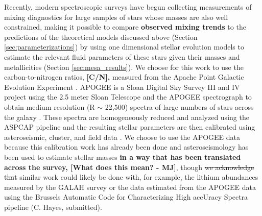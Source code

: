 

Recently, modern spectroscopic surveys have begun collecting measurements of mixing diagnostics for large samples of stars whose masses are also well constrained, making it possible to compare %
\textbf{observed mixing trends}
to the predictions of the 
theoretical models discussed above (Section \ref{sec:parameterizations}) by using one dimensional stellar evolution models to estimate the relevant fluid parameters of these stars given their masses and metallicities (Section \ref{sec:mesa_results}). 
%
We choose for this work to use the carbon-to-nitrogen ratios, \textbf{[C/N],} measured from the Apache Point Galactic Evolution Experiment \citep[APOGEE, ][]{Majewski2015,Majewski2017}. APOGEE is a Sloan Digital Sky Survey III and IV \citep{Blanton2017} project using the 2.5 meter Sloan Telescope \citep{Gunn2006} and the APOGEE spectrograph \citep{Wilson2019} to obtain medium resolution (R $\sim$ 22,500) spectra of large numbers of stars across the galaxy \citep{Zasowski2017, Beaton2021,Santana2021}. These spectra are homogeneously reduced and analyzed using the ASPCAP pipeline \citep{Nidever2015, Zamora2015, GarciaPerez2016} and the resulting stellar parameters are then calibrated using asteroseismic, cluster, and field data \citep{Holtzman2015,Holtzman2018, Jonsson2020}. We choose to use the APOGEE data because this calibration work has already been done and asteroseismology has been used to estimate stellar masses \textbf{in a way that has been translated across the survey, [What does this mean? - MJ]}, though \sout{we acknowledge that} similar work could likely be done with, for example, the lithium abundances measured by the GALAH survey \citep{buder2019} or the \ctwelvecthirteen data estimated from the APOGEE data using the Brussels Automatic Code
for Characterizing High accUracy Spectra \citep[BACCHUS,][]{Masseron2016_BACCHUS} pipeline (C. Hayes, submitted). 

